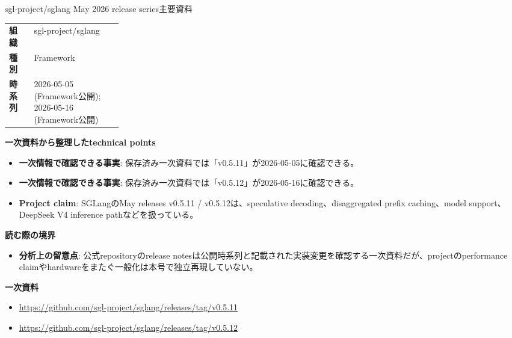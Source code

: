 \begin{technicalnote}{sgl-project/sglang May 2026 release series}{主要資料}
\begingroup
\begin{tabularx}{\linewidth}{@{}>{\bfseries}p{0.22\linewidth}X@{}}
組織 & sgl-project/sglang \\
種別 & Framework \\
時系列 & 2026-05-05 (Framework公開); 2026-05-16 (Framework公開) \\
\end{tabularx}
\smallskip
{\bfseries 一次資料から整理したtechnical points}
\begin{itemize}[leftmargin=1.5em,itemsep=0.35em]
\item \textbf{一次情報で確認できる事実}: 保存済み一次資料では「v0.5.11」が2026-05-05に確認できる。
\item \textbf{一次情報で確認できる事実}: 保存済み一次資料では「v0.5.12」が2026-05-16に確認できる。
\end{itemize}
\begin{minipage}{\linewidth}
\begin{itemize}[leftmargin=1.5em,itemsep=0.35em]
\item \textbf{Project claim}: SGLangのMay releases v0.5.11 / v0.5.12は、speculative decoding、disaggregated prefix caching、model support、DeepSeek V4 inference pathなどを扱っている。
\end{itemize}
{\bfseries 読む際の境界}
\begin{itemize}[leftmargin=1.5em,itemsep=0.35em]
\item \textbf{分析上の留意点}: 公式repositoryのrelease notesは公開時系列と記載された実装変更を確認する一次資料だが、projectのperformance claimやhardwareをまたぐ一般化は本号で独立再現していない。
\end{itemize}
\begin{samepage}
{\bfseries 一次資料}
\begingroup\sloppy
\begin{itemize}[leftmargin=1.5em,itemsep=0.25em]
\item {\scriptsize\url{https://github.com/sgl-project/sglang/releases/tag/v0.5.11}}
\item {\scriptsize\url{https://github.com/sgl-project/sglang/releases/tag/v0.5.12}}
\end{itemize}
\endgroup
\end{samepage}
\end{minipage}
\endgroup
\end{technicalnote}
\medskip

